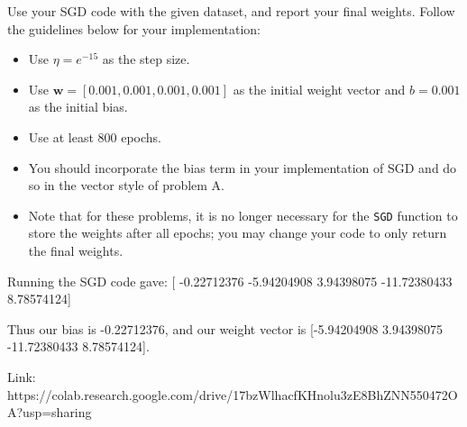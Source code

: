 \begin{problem}[6]
  Use your SGD code with the given dataset, and report your final weights. Follow the guidelines below for your implementation:

  \begin{itemize}
    \item Use $\eta = e^{-15}$ as the step size.  
    \item Use $\mathbf{w} = [0.001, 0.001, 0.001, 0.001]$ as the initial weight vector and $b = 0.001$ as the initial bias.
    \item Use at least 800 epochs.
    \item You should incorporate the bias term in your implementation of SGD and do so in the vector style of problem A.
    \item Note that for these problems, it is no longer necessary for the \texttt{SGD} function to store the weights after all epochs; you may change your code to only return the final weights.
  \end{itemize}
\end{problem}
\begin{solution}
Running the SGD code gave:
[ -0.22712376  -5.94204908   3.94398075 -11.72380433   8.78574124]

Thus our bias is -0.22712376, and our weight vector is [-5.94204908   3.94398075 -11.72380433   8.78574124].

Link: https://colab.research.google.com/drive/17bzWlhacfKHnolu3zE8BhZNN550472OA?usp=sharing
\end{solution}

